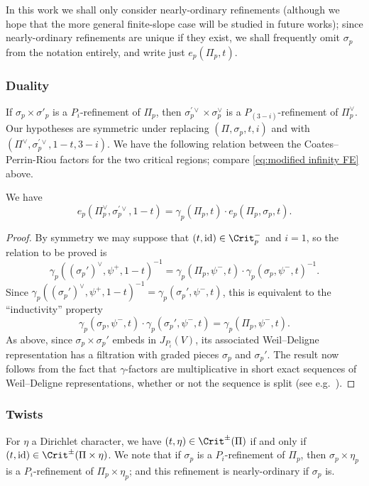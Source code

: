 \documentclass[10pt,reqno,a4paper]{amsart}
\begin{document}
   In this work we shall only consider nearly-ordinary refinements (although we hope that the more general finite-slope case will be studied in future works); since nearly-ordinary refinements are unique if they exist, we shall frequently omit $\sigma_p$ from the notation entirely, and write just $e_p(\Pi_p, t)$.

  \subsubsection*{Duality} If $\sigma_p\times\sigma'_p$ is a $P_i$-refinement of $\Pi_p$, then $\sigma_p^{\prime\vee}\times\sigma_p^\vee$ is a $P_{(3-i)}$-refinement of $\Pi_p^\vee$. Our hypotheses are symmetric under replacing $(\Pi, \sigma_p, t, i)$ and with $(\Pi^\vee, \sigma_p^{\prime \vee}, 1 - t, 3-i)$. We have the following relation between the Coates--Perrin-Riou factors for the two critical regions; compare \eqref{eq:modified infinity FE} above.
  
  \begin{lemma}\label{lem:FE at p}
  	We have
  \begin{equation}
   \label{eq:modified p FE}
   e_p(\Pi_p^\vee, \sigma_p^{\prime \vee}, 1 - t) = \gamma_p(\Pi_p, t) \cdot e_p(\Pi_p, \sigma_p, t).
  \end{equation}
  \end{lemma} 
 
 
  \begin{proof}
   By symmetry we may suppose that $(t, \mathrm{id}) \in \Crit_p^-$ and $i = 1$, so the relation to be proved is
   \[ \gamma_p((\sigma_p')^\vee, \psi^+, 1 - t)^{-1} = \gamma_p(\Pi_p, \psi^-, t) \cdot \gamma_p(\sigma_p, \psi^-, t)^{-1}. \]
   Since $\gamma_p((\sigma_p')^\vee, \psi^+, 1 - t)^{-1} = \gamma_p(\sigma_p', \psi^-, t)$, this is equivalent to the ``inductivity'' property
   \[ 
    \gamma_p (\sigma_p, \psi^-, t) \cdot \gamma_p(\sigma_p', \psi^-, t) = \gamma_p (\Pi_p, \psi^-, t).
   \]
   As above, since $\sigma_p \times \sigma_p'$ embeds in $J_{P_i}(V)$, its associated Weil--Deligne representation has a filtration with graded pieces $\sigma_p$ and $\sigma_p'$. The result now follows from the fact that $\gamma$-factors are multiplicative in short exact sequences of Weil--Deligne representations, whether or not the sequence is split (see e.g.~\cite[Corollary 4.5(ii)]{helmmoss15}).
  \end{proof}

 
  \subsubsection*{Twists} For $\eta$ a Dirichlet character, we have $(t, \eta) \in \Crit^{\pm}(\Pi)$ if and only if $(t, \mathrm{id}) \in \Crit^{\pm}(\Pi \times \eta)$. We note that if $\sigma_p$ is a $P_i$-refinement of $\Pi_p$, then $\sigma_p \times \eta_p$ is a $P_i$-refinement of $\Pi_p \times \eta_p$; and this refinement is nearly-ordinary if $\sigma_p$ is.
  
\end{document}
